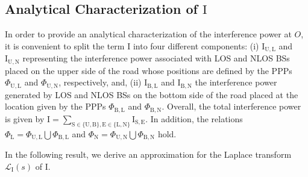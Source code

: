 \documentclass[10pt,journal,a4paper]{IEEEtran}
\begin{document}
\subsection{Analytical Characterization of $\mathrm{I}$}\label{subsec.anI}
In order to provide an analytical characterization of the interference power at $O$, it is convenient to split the term $\mathrm{I}$ into four different components: (i) $\mathrm{I}_{\mathrm{U,L}}$ and $\mathrm{I}_{\mathrm{U,N}}$ representing the interference power associated with LOS and NLOS BSs placed on the upper side of the road whose positions are defined by the PPPs $\Phi_{\mathrm{U},\mathrm{L}}$ and $\Phi_{\mathrm{U},\mathrm{N}}$, respectively, and, (ii) $\mathrm{I}_{\mathrm{B,L}}$ and $\mathrm{I}_{\mathrm{B,N}}$ the interference power generated by LOS and NLOS BSs on the bottom side of the road placed at the location given by the PPPs $\Phi_{\mathrm{B},\mathrm{L}}$ and $\Phi_{\mathrm{B},\mathrm{N}}$. Overall, the total interference power is given by $\mathrm{I} = \sum_{\mathrm{S} \in \{\mathrm{U},\mathrm{B}\}, \mathrm{E} \in \{\mathrm{L},\mathrm{N}\}} \mathrm{I}_{\mathrm{S},\mathrm{E}}$. In addition, the relations $\Phi_{\mathrm{L}} = \Phi_{\mathrm{U},\mathrm{L}} \bigcup \Phi_{\mathrm{B},\mathrm{L}}$ and $\Phi_{\mathrm{N}} = \Phi_{\mathrm{U},\mathrm{N}} \bigcup \Phi_{\mathrm{B},\mathrm{N}}$ hold.

In the following result, we derive an approximation for the Laplace transform $\mathcal{L}_{\mathrm{I}}(s)$ of $\mathrm{I}$.
\end{document}
